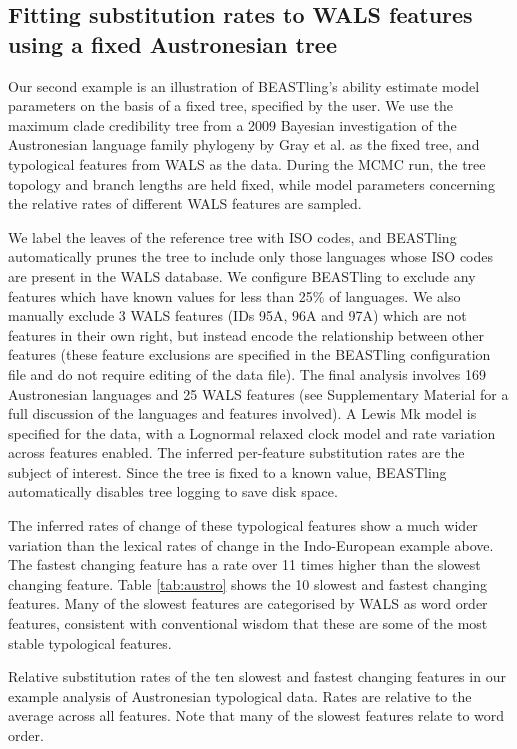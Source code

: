 \documentclass[10pt,a4paper]{article}
\begin{document}
\subsection{Fitting substitution rates to WALS features using a fixed Austronesian tree}

Our second example is an illustration of BEASTling's ability estimate model parameters on the basis of a fixed tree, specified by the user.  We use the maximum clade credibility tree from a 2009 Bayesian investigation of the Austronesian language family phylogeny by Gray et al.\cite{Gray2009} as the fixed tree, and typological features from WALS \cite{Dryer2013} as the data.  During the MCMC run, the tree topology and branch lengths are held fixed, while model parameters concerning the relative rates of different WALS features are sampled.

We label the leaves of the reference tree with ISO codes, and BEASTling automatically prunes the tree to include only those languages whose ISO codes are present in the WALS database.  We configure BEASTling to exclude any features which have known values for less than 25\% of languages.  We also manually exclude 3 WALS features (IDs 95A, 96A and 97A) which are not features in their own right, but instead encode the relationship between other features (these feature exclusions are specified in the BEASTling configuration file and do not require editing of the data file).  The final analysis involves 169 Austronesian languages and 25 WALS features (see Supplementary Material for a full discussion of the languages and features involved).  A Lewis Mk model is specified for the data, with a Lognormal relaxed clock model and rate variation across features enabled.  The inferred per-feature substitution rates are the subject of interest.  Since the tree is fixed to a known value, BEASTling automatically disables tree logging to save disk space.

The inferred rates of change of these typological features show a much wider variation than the lexical rates of change in the Indo-European example above.  The fastest changing feature has a rate over 11 times higher than the slowest changing feature.  Table \ref{tab:austro} shows the 10 slowest and fastest changing features.  Many of the slowest features are categorised by WALS as word order features, consistent with conventional wisdom that these are some of the most stable typological features.

\begin{table*}[ht]
	\begin{center}
		
	\end{center}
	\caption{Relative substitution rates of the ten slowest and fastest changing features in our example analysis of Austronesian typological data.  Rates are relative to the average across all features.  Note that many of the slowest features relate to word order.}
\label{tab:austro}
\end{table*}
\end{document}

